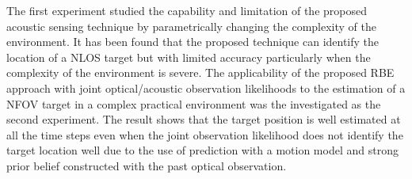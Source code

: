 The first experiment studied the capability and limitation of the proposed acoustic sensing technique by parametrically changing the complexity of the environment.  It has been found that the proposed technique can identify the location of a NLOS target but with limited accuracy particularly when the complexity of the environment is severe.  The applicability of the proposed RBE approach with joint optical/acoustic observation likelihoods to the estimation of a NFOV target in a complex practical environment was the investigated as the second experiment.  The result shows that the target position is well estimated at all the time steps even when the joint observation likelihood does not identify the target location well due to the use of prediction with a motion model and strong prior belief constructed with the past optical observation.  

